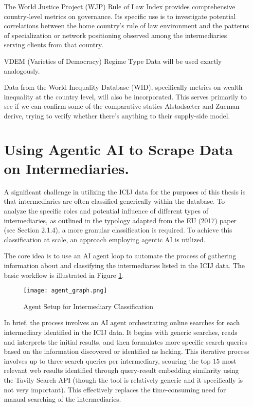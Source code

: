 The World Justice Project (WJP) Rule of Law Index provides comprehensive country-level metrics on governance. Its specific use is to investigate potential correlations between the home country's rule of law environment and the patterns of specialization or network positioning observed among the intermediaries serving clients from that country.

VDEM (Varieties of Democracy) Regime Type Data will be used exactly analogously.

Data from the World Inequality Database (WID), specifically metrics on wealth inequality at the country level, will also be incorporated.  This serves primarily to see if we can confirm some of the comparative statics Alstadsæter and Zucman derive, trying to verify whether there's anything to their supply-side model.

\section{Using Agentic AI to Scrape Data on Intermediaries.}
\label{sec:3_3}

A significant challenge in utilizing the ICIJ data for the purposes of this thesis is that intermediaries are often classified generically within the database. To analyze the specific roles and potential influence of different types of intermediaries, as outlined in the typology adapted from the EU (2017) paper (see Section 2.1.4), a more granular classification is required. To achieve this classification at scale, an approach employing agentic AI is utilized.

The core idea is to use an AI agent loop to automate the process of gathering information about and classifying the intermediaries listed in the ICIJ data. The basic workflow is illustrated in Figure \ref{fig:agent_loop_placeholder}.

\begin{figure}[htbp]
    \centering
    \texttt{[image: agent\_graph.png]} 
    \caption{Agent Setup for Intermediary Classification}
    \label{fig:agent_loop_placeholder}
\end{figure}

In brief, the process involves an AI agent orchestrating online searches for each intermediary identified in the ICIJ data. It begins with generic searches, reads and interprets the initial results, and then formulates more specific search queries based on the information discovered or identified as lacking. This iterative process involves up to three search queries per intermediary, scouring the top 15 most relevant web results identified through query-result embedding similarity using the Tavily Search API (though the tool is relatively generic and it specifically is not very important). This effectively replaces the time-consuming need for manual searching of the intermediaries.

